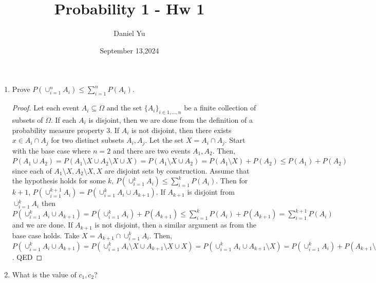 \documentclass[a4paper]{article}
\title{\Huge{Probability 1 - Hw 1}}
\author{\huge{Daniel Yu}}
\date{September 13,2024}
\begin{document}
\maketitle
\newpage%
\pagebreak

\begin{enumerate}
  \item Prove $P(\cup_{i=1}^n A_i) \leq \sum_{i=1}^n P(A_i)$.
      \begin{proof}
        Let each event $A_i \subseteq \Omega$ and the set $\{A_i\}_{i \in 1,\ldots,n}$ be a finite collection of subsets of 
        $\Omega$. If each $A_i$ is disjoint, then we are done from the definition of a probability measure property 3. If
        $A_i$ is not disjoint, then there exists $x \in A_i \cap A_j$ for two distinct subsets $A_i,A_j$. Let the set
        $X = A_i \cap A_j$. Start with the base case where $n=2$ and there are two events $A_1, A_2$. Then, 
        $P(A_1 \cup A_2) = P(A_1 \setminus X \cup A_2 \setminus X \cup X) = P\left(A_1 \setminus X \cup A_2 \right) = P(A_1 \setminus X) 
        + P(A_2) \leq P(A_1) + P(A_2)$ since each of $A_1 \setminus X, A_2 \setminus X, X$ are disjoint sets by construction. Assume
        that the hypothesis holds for some $k$, $P(\cup_{i=1}^k A_i) \leq \sum_{i=1}^{k} P(A_i)$. Then for $k+1$, 
        $P(\cup_{i=1}^{k+1} A_i)= P(\cup_{i=1}^k A_i \cup A_{k+1})$. If $A_{k+1}$ is disjoint from  $\cup_{i=1}^k A_i$
        then  $P(\cup_{i=1}^k A_i \cup A_{k+1}) = P(\cup_{i=1}^k A_i) + P(A_{k+1}) \leq  \sum_{i=1}^{k} P(A_i) + P(A_{k+1})
        = \sum_{i=1}^{k+1} P(A_i)$ and we are done. If $A_{k+1}$ is not disjoint, then a similar argument as from the base case
        holds. Take $X = A_{k+1} \cap \cup_{i=1}^k A_i$. Then,
        $P(\cup_{i=1}^{k} A_i \cup A_{k+1}) = P(\cup_{i=1}^{k} A_i \setminus X \cup A_{k+1} \setminus X \cup X) = 
        P(\cup_{i=1}^{k} A_i \cup A_{k+1} \setminus X) = P(\cup_{i=1}^k A_i) + P(A_{k+1} \setminus X) \leq \sum_{i=1}^k P(A_i) + P(A_{k+1} \setminus X) 
        \leq  \sum_{i=1}^k P(A_i) + P(A_{k+1}) = \sum_{i=1}^{k+1} P(A_i)$. QED
      \end{proof}
    \item What is the value of $c_1,c_2$?
      \begin{note}
      

\end{note}
\end{enumerate}
\end{document}
